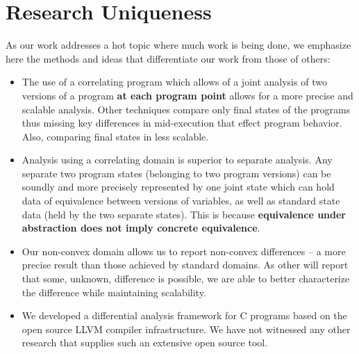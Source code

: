 \section{Research Uniqueness}

As our work addresses a hot topic where much work is being done, we emphasize here the methods and ideas that differentiate our work from those of others:

\begin{itemize}
\item The use of a correlating program which allows of a joint analysis of two versions of a program \textbf{at each program point} allows for a more precise and scalable analysis. Other techniques compare only final states of the programs thus missing key differences in mid-execution that effect program behavior. Also, comparing final states in less scalable.
\item Analysis using a correlating domain is superior to separate analysis. Any separate two program states (belonging to two program versions) can be soundly and more precisely represented by one joint state which can hold data of equivalence between versions of variables, as well as standard state data (held by the two separate states). This is because \textbf{equivalence under abstraction does not imply concrete equivalence}.
\item Our non-convex domain allows us to report non-convex differences -- a more precise result than those achieved by standard domains. As other will report that some, unknown, difference is possible, we are able to better characterize the difference while maintaining scalability.
\item We developed a differential analysis framework for C programs based on the open source LLVM compiler infrastructure. We have not witnessed any other research that supplies such an extensive open source tool.
\end{itemize} 